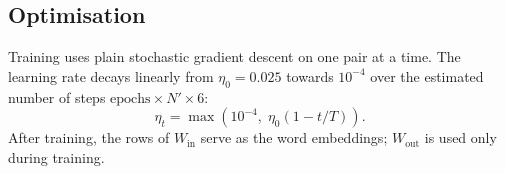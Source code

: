 \subsection{Optimisation}

Training uses plain stochastic gradient descent on one pair at a time. The learning rate decays linearly from $\eta_0 = 0.025$ towards $10^{-4}$ over the estimated number of steps $\text{epochs} \times N' \times 6$:
\begin{equation}
    \eta_t = \max\!\left(10^{-4}, \; \eta_0 \left(1 - t / T\right)\right).
\end{equation}
After training, the rows of $W_{\text{in}}$ serve as the word embeddings; $W_{\text{out}}$ is used only during training.
